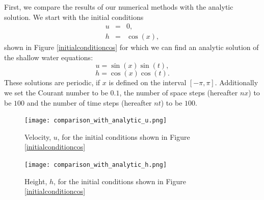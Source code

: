 \documentclass[a4paper, 10pt, notitlepage]{article}
\begin{document}
First, we compare the results of our numerical methods with the analytic solution. We start with the initial conditions 
\begin{eqnarray}
u  & =  & 0, \\
h & = &  \cos(x),
\end{eqnarray}
shown in Figure \ref{initialconditioncos} for which we can find an analytic solution of the shallow water equations:
\begin{equation}\label{uanalytic}
u = \sin(x)\sin(t),
\end{equation}
\begin{equation}\label{hanalytic}
h = \cos(x)\cos(t).
\end{equation}
These solutions are periodic, if $x$ is defined on the interval $[-\pi, \pi]$. Additionally we set the Courant number to be $0.1$, the number of space steps (hereafter $nx$) to be $100$ and the number of time steps (hereafter $nt$) to be $100$.


\renewcommand\theContinuedFloat{\alph{ContinuedFloat}}
\begin{figure} [H]
	\begin{minipage}{.5\textwidth}
		\ContinuedFloat*
		\captionsetup{width=0.9\textwidth}
		\captionsetup{justification=centering}
		\texttt{[image: comparison\_with\_analytic\_u.png]}
		\caption{\label{exact velocity} Velocity, $u$, for the initial conditions shown in Figure \ref{initialconditioncos}} 
	\end{minipage}
	\begin{minipage}{.5\textwidth}
		\ContinuedFloat
		\captionsetup{width=0.9\textwidth}
		\captionsetup{justification=centering}
		\texttt{[image: comparison\_with\_analytic\_h.png]}
		\caption{\label{exact height} Height, $h$, for the initial conditions shown in Figure \ref{initialconditioncos}} 
	\end{minipage}
\end{figure}
\end{document}
